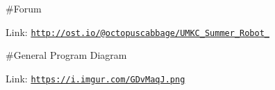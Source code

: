 \#\-Forum

Link\-: \href{http://ost.io/@octopuscabbage/UMKC_Summer_Robot_2014}{\tt http\-://ost.\-io/@octopuscabbage/\-U\-M\-K\-C\-\_\-\-Summer\-\_\-\-Robot\-\_}

\#\-General Program Diagram

Link\-: \href{https://i.imgur.com/GDvMaqJ.png}{\tt https\-://i.\-imgur.\-com/\-G\-Dv\-Maq\-J.\-png} 